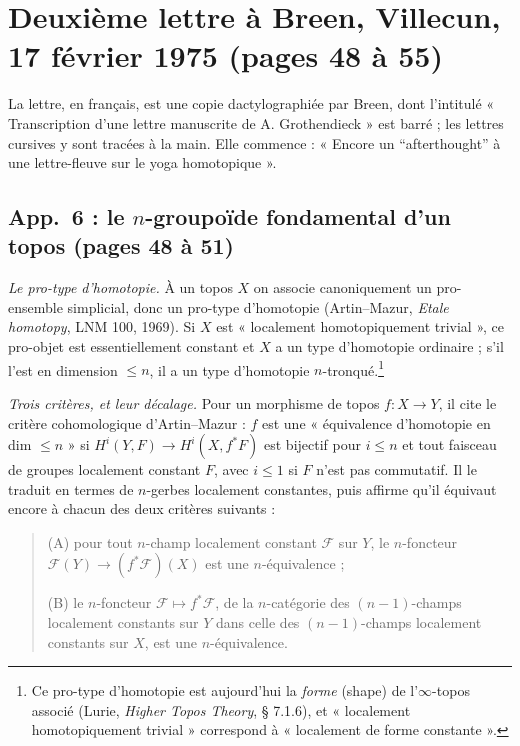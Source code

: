 \documentclass[11pt,a4paper]{article}
\begin{document}
\section*{Deuxième lettre à Breen, Villecun, 17 février 1975 (pages 48 à 55)}

La lettre, en français, est une copie dactylographiée par Breen, dont
l'intitulé « Transcription d'une lettre manuscrite de A. Grothendieck » est
barré ; les lettres cursives y sont tracées à la main. Elle commence : « Encore
un “afterthought” à une lettre-fleuve sur le yoga homotopique ».

\subsection*{App.~6 : le $n$-groupoïde fondamental d'un topos (pages 48 à 51)}

\emph{Le pro-type d'homotopie.} À un topos $X$ on associe canoniquement un
pro-ensemble simplicial, donc un pro-type d'homotopie (Artin--Mazur,
\emph{Etale homotopy}, LNM 100, 1969). Si $X$ est « localement
homotopiquement trivial », ce pro-objet est essentiellement constant et $X$
a un type d'homotopie ordinaire ; s'il l'est en dimension $\leqslant n$, il
a un type d'homotopie $n$-tronqué.\footnote{Ce pro-type d'homotopie est
aujourd'hui la \emph{forme} (shape) de l'$\infty$-topos associé (Lurie,
\emph{Higher Topos Theory}, § 7.1.6), et « localement homotopiquement
trivial » correspond à « localement de forme constante ».}

\emph{Trois critères, et leur décalage.} Pour un morphisme de topos
$f : X \to Y$, il cite le critère cohomologique d'Artin--Mazur : $f$ est une
« équivalence d'homotopie en dim $\leqslant n$ » si $H^i(Y,F)\to
H^i(X,f^*F)$ est bijectif pour $i \leqslant n$ et tout faisceau de groupes
localement constant $F$, avec $i \leqslant 1$ si $F$ n'est pas
commutatif. Il le traduit en termes de $n$-gerbes localement constantes,
puis affirme qu'il équivaut encore à chacun des deux critères suivants :

\begin{quote}
(A) pour tout $n$-champ localement constant $\mathcal{F}$ sur $Y$, le
$n$-foncteur $\mathcal{F}(Y) \to (f^*\mathcal{F})(X)$ est une
$n$-équivalence ;

(B) le $n$-foncteur $\mathcal{F}\mapsto f^*\mathcal{F}$, de la $n$-catégorie
des $(n-1)$-champs localement constants sur $Y$ dans celle des
$(n-1)$-champs localement constants sur $X$, est une $n$-équivalence.
\end{quote}
\end{document}
